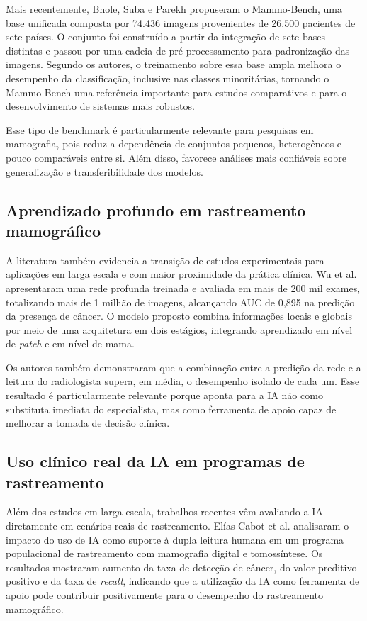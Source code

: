 Mais recentemente, Bhole, Suba e Parekh \cite{bhole2025} propuseram o Mammo-Bench, uma base unificada composta por 74.436 imagens provenientes de 26.500 pacientes de sete países. O conjunto foi construído a partir da integração de sete bases distintas e passou por uma cadeia de pré-processamento para padronização das imagens. Segundo os autores, o treinamento sobre essa base ampla melhora o desempenho da classificação, inclusive nas classes minoritárias, tornando o Mammo-Bench uma referência importante para estudos comparativos e para o desenvolvimento de sistemas mais robustos.

Esse tipo de benchmark é particularmente relevante para pesquisas em mamografia, pois reduz a dependência de conjuntos pequenos, heterogêneos e pouco comparáveis entre si. Além disso, favorece análises mais confiáveis sobre generalização e transferibilidade dos modelos.

\subsection{Aprendizado profundo em rastreamento mamográfico}

A literatura também evidencia a transição de estudos experimentais para aplicações em larga escala e com maior proximidade da prática clínica. Wu et al. \cite{wu2020} apresentaram uma rede profunda treinada e avaliada em mais de 200 mil exames, totalizando mais de 1 milhão de imagens, alcançando AUC de 0{,}895 na predição da presença de câncer. O modelo proposto combina informações locais e globais por meio de uma arquitetura em dois estágios, integrando aprendizado em nível de \textit{patch} e em nível de mama.

Os autores também demonstraram que a combinação entre a predição da rede e a leitura do radiologista supera, em média, o desempenho isolado de cada um. Esse resultado é particularmente relevante porque aponta para a IA não como substituta imediata do especialista, mas como ferramenta de apoio capaz de melhorar a tomada de decisão clínica.

\subsection{Uso clínico real da IA em programas de rastreamento}

Além dos estudos em larga escala, trabalhos recentes vêm avaliando a IA diretamente em cenários reais de rastreamento. Elías-Cabot et al. \cite{eliascabot2024} analisaram o impacto do uso de IA como suporte à dupla leitura humana em um programa populacional de rastreamento com mamografia digital e tomossíntese. Os resultados mostraram aumento da taxa de detecção de câncer, do valor preditivo positivo e da taxa de \textit{recall}, indicando que a utilização da IA como ferramenta de apoio pode contribuir positivamente para o desempenho do rastreamento mamográfico.

